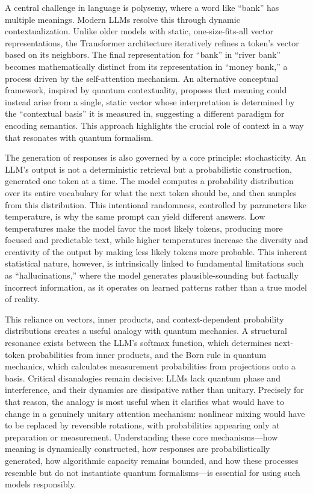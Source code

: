 \documentclass[%
  reprint,
  superscriptaddress,
  showpacs,
  showkeys,
  amsmath,amssymb,
  pra,
  longbibliography,
  floatfix,
  x11names
]{revtex4-2}
\begin{document}
A central challenge in language is polysemy, where a word like ``bank'' has multiple meanings. Modern LLMs resolve this through dynamic contextualization. Unlike older models with static, one-size-fits-all vector representations, the Transformer architecture iteratively refines a token's vector based on its neighbors. The final representation for ``bank'' in ``river bank'' becomes mathematically distinct from its representation in ``money bank,'' a process driven by the self-attention mechanism. An alternative conceptual framework, inspired by quantum contextuality, proposes that meaning could instead arise from a single, static vector whose interpretation is determined by the ``contextual basis'' it is measured in, suggesting a different paradigm for encoding semantics. This approach highlights the crucial role of context in a way that resonates with quantum formalism.

The generation of responses is also governed by a core principle: stochasticity. An LLM's output is not a deterministic retrieval but a probabilistic construction, generated one token at a time. The model computes a probability distribution over its entire vocabulary for what the next token should be, and then samples from this distribution. This intentional randomness, controlled by parameters like temperature, is why the same prompt can yield different answers. Low temperatures make the model favor the most likely tokens, producing more focused and predictable text, while higher temperatures increase the diversity and creativity of the output by making less likely tokens more probable. This inherent statistical nature, however, is intrinsically linked to fundamental limitations such as ``hallucinations,'' where the model generates plausible-sounding but factually incorrect information, as it operates on learned patterns rather than a true model of reality.

This reliance on vectors, inner products, and context-dependent probability distributions creates a useful analogy with quantum mechanics. A structural resonance exists between the LLM's softmax function, which determines next-token probabilities from inner products, and the Born rule in quantum mechanics, which calculates measurement probabilities from projections onto a basis. Critical disanalogies remain decisive: LLMs lack quantum phase and interference, and their dynamics are dissipative rather than unitary. Precisely for that reason, the analogy is most useful when it clarifies what would have to change in a genuinely unitary attention mechanism: nonlinear mixing would have to be replaced by reversible rotations, with probabilities appearing only at preparation or measurement. Understanding these core mechanisms---how meaning is dynamically constructed, how responses are probabilistically generated, how algorithmic capacity remains bounded, and how these processes resemble but do not instantiate quantum formalisms---is essential for using such models responsibly.
\end{document}
